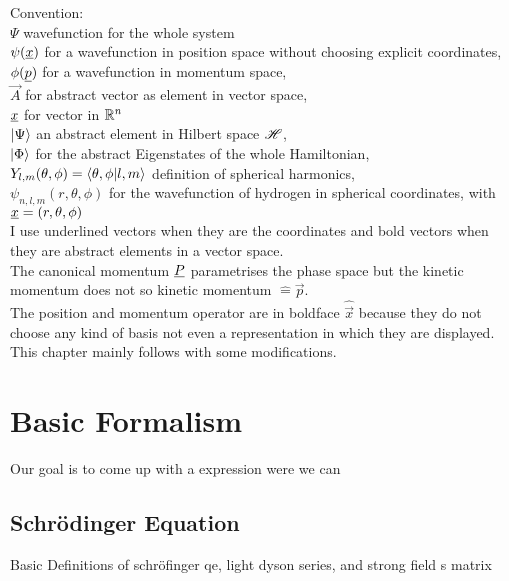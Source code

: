 Convention: \\
$\Psi$ wavefunction for the whole system  \\
$\psi(\underline{x})$ for a wavefunction in position space without choosing explicit coordinates, \\
$\phi(\underline{p})$  for a wavefunction in momentum space, \\
$\vec{A}$ for abstract vector as element in vector space, \\
$\underline{x}$ for vector in $\mathbb{R}^n$ \\
$\ket{\Psi}$ an abstract element in Hilbert space $\mathscr{H}$, \\
$\ket{\Phi}$ for the abstract Eigenstates of the whole Hamiltonian, \\
$Y_{l, m}(\theta, \phi) = \braket{\theta, \phi | l, m}$ definition of spherical harmonics, \\
$\psi_{n, l, m}(r, \theta, \phi)$ for the wavefunction of hydrogen in spherical coordinates, with $\underline{x}=(r, \theta, \phi)$ \\
I use underlined vectors when they are the coordinates and bold vectors when they are abstract elements in a vector space. \\
The canonical momentum $\underline{P}$ parametrises the phase space but the kinetic momentum does not so kinetic momentum $\hat{=} \vec{p}$.\\
The position and momentum operator are in boldface $\hat{\vec{x}}$ because they do not choose any kind of basis not even a representation in which they are displayed.\\


This chapter mainly follows \cite{Ivanov20012005} with some modifications.



\section{Basic Formalism}
Our goal is to come up with a expression were we can 


\subsection{Schrödinger Equation}

Basic Definitions of schröfinger qe, light dyson series, and strong field s matrix


